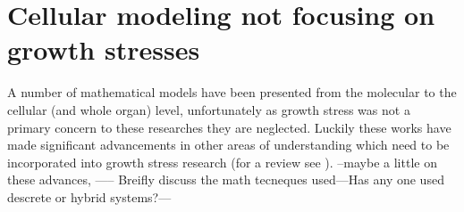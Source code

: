 \section{Cellular modeling not focusing on growth stresses}
A number of mathematical models have been presented from the
molecular to the cellular (and whole organ) level, unfortunately as
growth stress was not a primary concern to these researches they are neglected.
Luckily these works have made significant advancements in other areas of
understanding which need to be incorporated into growth stress research (for a review see \cite{ISI:000261731700022}). --maybe
a little on these advances, \cite{ISI:000261731700022} ----- Breifly discuss the math
tecneques used---Has any one used descrete or hybrid systems?---
